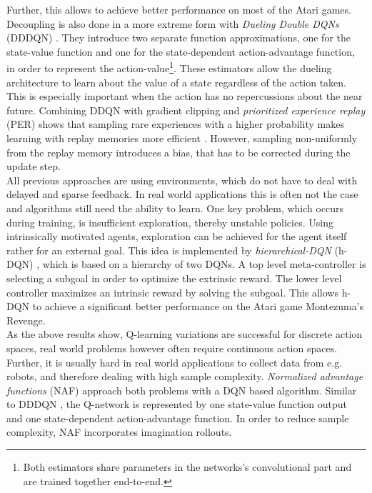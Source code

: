 	Further, this allows to achieve better performance on most of the Atari games. 
	Decoupling is also done in a more extreme form with \textit{Dueling Double DQNs} (DDDQN) \cite{Wang2016}. 
	They introduce two separate function approximations, one for the state-value function and one for the state-dependent action-advantage function, in order to represent the action-value\footnote{Both estimators share parameters in the networks's convolutional part and are trained together end-to-end.}.
	These estimators allow the dueling architecture to learn about the value of a state regardless of the action taken. 
	This is especially important when the action has no repercussions about the near future. 
	Combining DDQN with gradient clipping and \textit{prioritized experience replay} (PER) \cite{Schaul2015} shows that sampling rare experiences with a higher probability makes learning with replay memories more efficient \cite{Lin1992}. 
	However, sampling non-uniformly from the replay memory introduces a bias, that has to be corrected during the update step.\\
	All previous approaches are using environments, which do not have to deal with delayed and sparse feedback.
	In real world applications this is often not the case and algorithms still need the ability to learn.
	One key problem, which occurs during training, is insufficient exploration, thereby unstable policies. 
	Using intrinsically motivated agents, exploration can be achieved for the agent itself rather for an external goal. 
	This idea is implemented by \textit{hierarchical-DQN} (h-DQN) \cite{Kulkarni2016}, which is based on a hierarchy of two DQNs.
	A top level meta-controller is selecting a subgoal in order to optimize the extrinsic reward.
	The lower level controller maximizes an intrinsic reward by solving the subgoal.
	This allows h-DQN to achieve a significant better performance on the Atari game Montezuma's Revenge.\\
	As the above results show, Q-learning variations are successful for discrete action spaces, real world problems however often require continuous action spaces.
	Further, it is usually hard in real world applications to collect data from e.g. robots, and therefore dealing with high sample complexity.
	\textit{Normalized advantage functions} (NAF) \cite{Gu2016} approach both problems with a DQN based algorithm.
	Similar to DDDQN \cite{Wang2016}, the Q-network is represented by one state-value function output and one state-dependent action-advantage function.
	In order to reduce sample complexity, NAF incorporates imagination rollouts. 
